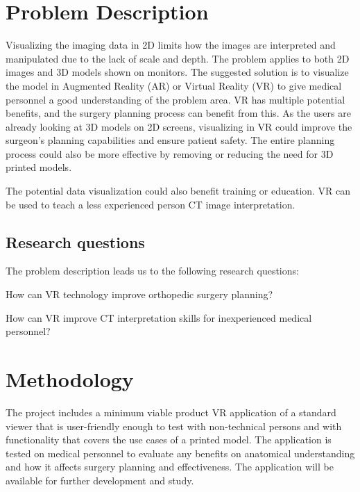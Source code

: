 \documentclass[a4paper]{report}
\begin{document}
\section{Problem Description}
Visualizing the imaging data in 2D limits how the images are interpreted and manipulated due to the lack of scale and depth. The problem applies to both 2D images and 3D models shown on monitors.
The suggested solution is to visualize the model in Augmented Reality (AR) or Virtual Reality (VR) to give medical personnel a good understanding of the problem area.
VR has multiple potential benefits, and the surgery planning process can benefit from this. As the users are already looking at 3D models on 2D screens, visualizing in VR could improve the surgeon's planning capabilities and ensure patient safety.
The entire planning process could also be more effective by removing or reducing the need for 3D printed models.

The potential data visualization could also benefit training or education. VR can be used to teach a less experienced person CT image interpretation.

\subsection{Research questions}
The problem description leads us to the following research questions:

How can VR technology improve orthopedic surgery planning?


How can VR improve CT interpretation skills for inexperienced medical personnel?

\section{Methodology}

The project includes a minimum viable product VR application of a standard viewer that is user-friendly enough to test with non-technical persons and with functionality that covers the use cases of a printed model.
The application is tested on medical personnel to evaluate any benefits on anatomical understanding and how it affects surgery planning and effectiveness. The application will be available for further development and study.
\end{document}
